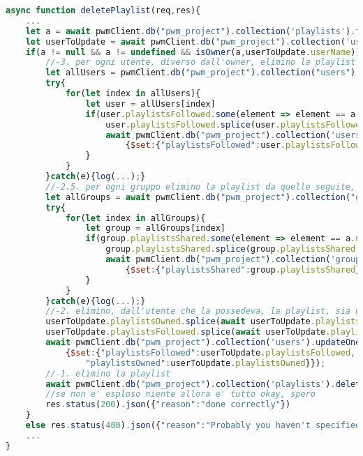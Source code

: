 \begin{lstlisting}[language=Javascript]
async function deletePlaylist(req,res){
    ...
    let a = await pwmClient.db("pwm_project").collection('playlists').findOne({"name": validator.escape(req.params.name)})
    let userToUpdate = await pwmClient.db("pwm_project").collection('users').findOne({"email":decoded.email});
    if(a != null && a != undefined && isOwner(a,userToUpdate.userName)){
        //-3. per ogni utente, diverso dall'owner, elimino la playlist da quelle seguite, laddove presente.
        let allUsers = pwmClient.db("pwm_project").collection("users").find({"email":{$ne: decoded.email}}).toArray()
        try{
            for(let index in allUsers){
                let user = allUsers[index]
                if(user.playlistsFollowed.some(element => element == a.name)){
                    user.playlistsFollowed.splice(user.playlistsFollowed.indexOf(a.name),1)
                    await pwmClient.db("pwm_project").collection('users').updateOne({"email":user.email},
                        {$set:{"playlistsFollowed":user.playlistsFollowed}})
                }
            }
        }catch(e){log(...);}
        //-2.5. per ogni gruppo elimino la playlist da quelle seguite, laddove presente
        let allGroups = await pwmClient.db("pwm_project").collection("groups").find({}).toArray()
        try{
            for(let index in allGroups){
                let group = allGroups[index]
                if(group.playlistsShared.some(element => element == a.name)){
                    group.playlistsShared.splice(group.playlistsShared.indexOf(a.name),1)
                    await pwmClient.db("pwm_project").collection('groups').updateOne({"name":group.name},
                        {$set:{"playlistsShared":group.playlistsShared}})
                }
            }
        }catch(e){log(...);}
        //-2. elimino, dall'utente che la possedeva, la playlist, sia da quelle seguite che da quelle totali (ossia cerco di assicurare l'integrita' referenziale)
        userToUpdate.playlistsOwned.splice(await userToUpdate.playlistsOwned.indexOf(a.name),1)
        userToUpdate.playlistsFollowed.splice(await userToUpdate.playlistsFollowed.indexOf(a.name),1)
        await pwmClient.db("pwm_project").collection('users').updateOne({"email":decoded.email},
            {$set:{"playlistsFollowed":userToUpdate.playlistsFollowed,
                "playlistsOwned":userToUpdate.playlistsOwned}});
        //-1. elimino la playlist
        await pwmClient.db("pwm_project").collection('playlists').deleteOne(a)
        //se non e' esploso niente allora e' tutto okay, spero
        res.status(200).json({"reason":"done correctly"})
    }
    else res.status(400).json({"reason":"Probably you haven't specified the right params"})
    ...
}
\end{lstlisting}

